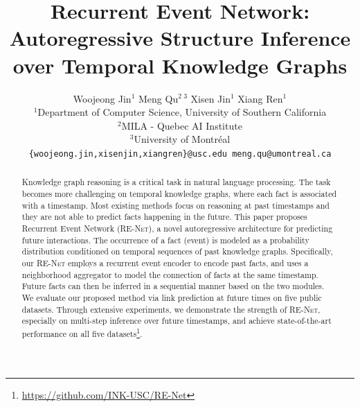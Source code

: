\documentclass[11pt,a4paper]{article}
\title{Recurrent Event Network: Autoregressive Structure Inference over Temporal Knowledge Graphs}
\author{Woojeong Jin$^1$ \quad Meng Qu$^2\, ^3$ \quad Xisen Jin$^1$ \quad Xiang Ren$^1$ \\
$^1$Department of Computer Science, University of Southern California\\
$^2$MILA - Quebec AI Institute \\
$^3$University of Montr\'{e}al\\
\texttt{\{woojeong.jin,xisenjin,xiangren\}@usc.edu meng.qu@umontreal.ca} \\
}
\date{}
\newcommand{\method}{\textsc{RE-Net}\xspace}
\begin{document}
\maketitle
\begin{abstract}




Knowledge graph reasoning is a critical task in natural language processing.
The task becomes more challenging on temporal knowledge graphs, where each fact is associated with a timestamp.
Most existing methods focus on reasoning at past timestamps and they are not able to predict facts happening in the future.
This paper proposes Recurrent Event Network (\method), a novel autoregressive architecture for predicting future interactions.
The occurrence of a fact (event) is modeled as a probability distribution conditioned on temporal sequences of past knowledge graphs. 
Specifically, our \method employs a recurrent event encoder to encode past facts, and uses a neighborhood aggregator to model the connection of facts at the same timestamp.
Future facts can then be inferred in a sequential manner based on the two modules.
We evaluate our proposed method via link prediction at future times on five public datasets. Through extensive experiments, we demonstrate the strength of \method, especially on multi-step inference over future timestamps, and achieve state-of-the-art performance on all five datasets\footnote{\small \url{https://github.com/INK-USC/RE-Net}}.




\end{abstract}
\end{document}

